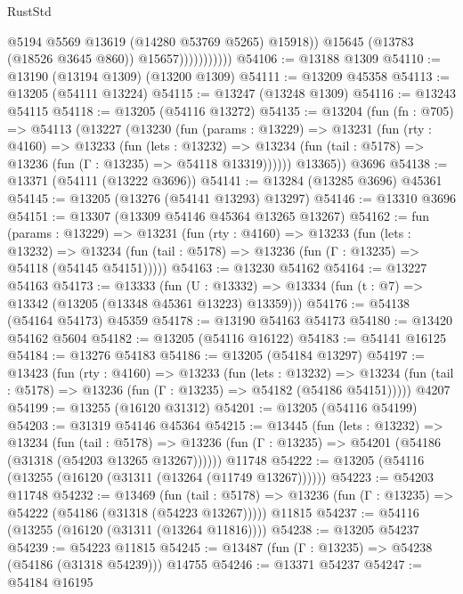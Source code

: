 \begin{lexlean}{RustStd}
\begin{coremodule}
                              @5194
                              @5569
                              @13619
                              (@14280 @53769 @5265)
                              @15918))
                          @15645
                          (@13783 (@18526 @3645 @860))
                          @15657)))))))))))
@54106 := @13188 @1309
@54110 := @13190 (@13194 @1309) (@13200 @1309)
@54111 := @13209 @45358
@54113 := @13205 (@54111 @13224)
@54115 := @13247 (@13248 @1309)
@54116 := @13243 @54115
@54118 := @13205 (@54116 @13272)
@54135 := @13204
    (fun (fn : @705) =>
    @54113
      (@13227
        (@13230
          (fun (params : @13229) =>
          @13231
            (fun (rty : @4160) =>
            @13233
              (fun (lets : @13232) =>
              @13234 (fun (tail : @5178) => @13236 (fun (Γ : @13235) => @54118 @13319))))))
        @13365))
    @3696
@54138 := @13371 (@54111 (@13222 @3696))
@54141 := @13284 (@13285 @3696) @45361
@54145 := @13205 (@13276 (@54141 @13293) @13297)
@54146 := @13310 @3696
@54151 := @13307 (@13309 @54146 @45364 @13265 @13267)
@54162 := fun (params : @13229) =>
  @13231
    (fun (rty : @4160) =>
    @13233
      (fun (lets : @13232) =>
      @13234 (fun (tail : @5178) => @13236 (fun (Γ : @13235) => @54118 (@54145 @54151)))))
@54163 := @13230 @54162
@54164 := @13227 @54163
@54173 := @13333
    (fun (U : @13332) => @13334 (fun (t : @7) => @13342 (@13205 (@13348 @45361 @13223) @13359)))
@54176 := @54138 (@54164 @54173) @45359
@54178 := @13190 @54163 @54173
@54180 := @13420 @54162 @5604
@54182 := @13205 (@54116 @16122)
@54183 := @54141 @16125
@54184 := @13276 @54183
@54186 := @13205 (@54184 @13297)
@54197 := @13423
    (fun (rty : @4160) =>
    @13233
      (fun (lets : @13232) =>
      @13234 (fun (tail : @5178) => @13236 (fun (Γ : @13235) => @54182 (@54186 @54151)))))
    @4207
@54199 := @13255 (@16120 @31312)
@54201 := @13205 (@54116 @54199)
@54203 := @31319 @54146 @45364
@54215 := @13445
    (fun (lets : @13232) =>
    @13234
      (fun (tail : @5178) =>
      @13236 (fun (Γ : @13235) => @54201 (@54186 (@31318 (@54203 @13265 @13267))))))
    @11748
@54222 := @13205 (@54116 (@13255 (@16120 (@31311 (@13264 (@11749 @13267))))))
@54223 := @54203 @11748
@54232 := @13469
    (fun (tail : @5178) => @13236 (fun (Γ : @13235) => @54222 (@54186 (@31318 (@54223 @13267)))))
    @11815
@54237 := @54116 (@13255 (@16120 (@31311 (@13264 @11816))))
@54238 := @13205 @54237
@54239 := @54223 @11815
@54245 := @13487 (fun (Γ : @13235) => @54238 (@54186 (@31318 @54239))) @14755
@54246 := @13371 @54237
@54247 := @54184 @16195

\end{coremodule}
\end{lexlean}
